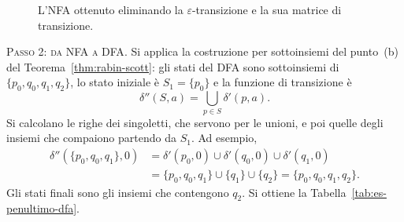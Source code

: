 \documentclass[a4paper, 11pt, oneside]{book}
\theoremstyle{formale}
\begin{document}
    \begin{figure}[H]
        \centering
        \caption{L'NFA ottenuto eliminando la $\varepsilon$-transizione e la sua
            matrice di transizione.}
        \label{fig:es-penultimo-nfa}
    \end{figure}

    \textsc{Passo 2: da NFA a DFA}. Si applica la costruzione per sottoinsiemi del
    punto~(b) del Teorema~\ref{thm:rabin-scott}: gli stati del DFA sono sottoinsiemi di
    $\{p_0, q_0, q_1, q_2\}$, lo stato iniziale \`e $S_1 = \{p_0\}$ e la funzione di
    transizione \`e
    \begin{equation*}
        \delta''(S, a) = \bigcup_{p \in S} \delta'(p, a).
    \end{equation*}
    Si calcolano le righe dei singoletti, che servono per le unioni, e poi quelle degli
    insiemi che compaiono partendo da $S_1$. Ad esempio,
    \begin{align*}
        \delta''(\{p_0, q_0, q_1\}, 0)
            &= \delta'(p_0, 0) \cup \delta'(q_0, 0) \cup \delta'(q_1, 0) \\
            &= \{p_0, q_0, q_1\} \cup \{q_1\} \cup \{q_2\} = \{p_0, q_0, q_1, q_2\}.
    \end{align*}
    Gli stati finali sono gli insiemi che contengono $q_2$. Si ottiene la
    Tabella~\ref{tab:es-penultimo-dfa}.
\end{document}
